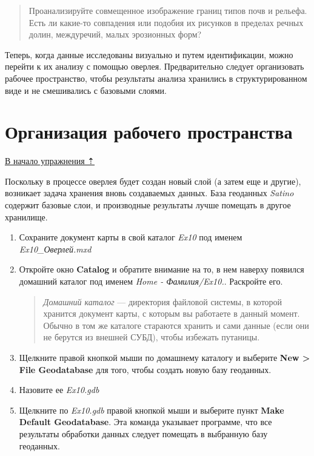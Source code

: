 \documentclass[12pt,]{book}
\begin{document}
\begin{quote}
Проанализируйте совмещенное изображение границ типов почв и рельефа. Есть ли какие-то совпадения или подобия их рисунков в пределах речных долин, междуречий, малых эрозионных форм?
\end{quote}

Теперь, когда данные исследованы визуально и путем идентификации, можно перейти к их анализу с помощью оверлея. Предварительно следует организовать рабочее пространство, чтобы результаты анализа хранились в структурированном виде и не смешивались с базовыми слоями.

\hypertarget{overlay-workspace}{%
\section{Организация рабочего пространства}\label{overlay-workspace}}

\protect\hyperlink{overlay}{В начало упражнения ⇡}

Поскольку в процессе оверлея будет создан новый слой (а затем еще и другие), возникает задача хранения вновь создаваемых данных. База геоданных \emph{Satino} содержит базовые слои, и производные результаты лучше помещать в другое хранилище.

\begin{enumerate}
\def\labelenumi{\arabic{enumi}.}
\item
  Сохраните документ карты в свой каталог \emph{Ex10} под именем \emph{Ex10\_Оверлей.mxd}
\item
  Откройте окно \textbf{Catalog} и обратите внимание на то, в нем наверху появился домашний каталог под именем \emph{Home - Фамилия/Ex10.}. Раскройте его.

  \begin{quote}
  \emph{Домашний каталог} --- директория файловой системы, в которой хранится документ карты, с которым вы работаете в данный момент. Обычно в том же каталоге стараются хранить и сами данные (если они не берутся из внешней СУБД), чтобы избежать путаницы.
  \end{quote}
\item
  Щелкните правой кнопкой мыши по домашнему каталогу и выберите \textbf{New \textgreater{} File Geodatabase} для того, чтобы создать новую базу геоданных.
\item
  Назовите ее \emph{Ex10.gdb}
\item
  Щелкните по \emph{Ex10.gdb} правой кнопкой мыши и выберите пункт \textbf{Make Default Geodatabase}. Эта команда указывает программе, что все результаты обработки данных следует помещать в выбранную базу геоданных.
\end{enumerate}
\end{document}
